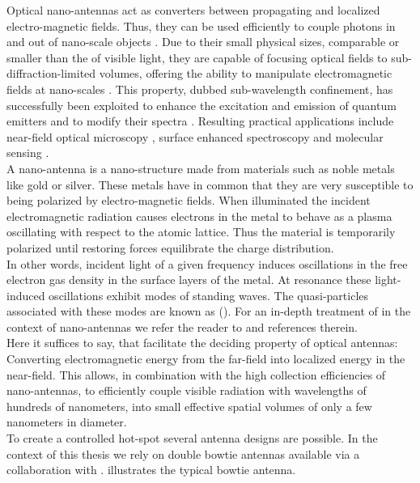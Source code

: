 		Optical nano-antennas act as converters between propagating and localized electro-magnetic fields. Thus, they can be used efficiently to couple photons in and out of nano-scale objects \cite{Curto2010}. Due to their small physical sizes, comparable or smaller than the \wl of visible light, they are capable of focusing optical fields to sub-diffraction-limited volumes, offering the ability to manipulate electromagnetic fields at nano-scales \cite{taminiau2008optical, ding2009understanding}. This property, dubbed sub-wavelength confinement, has successfully been exploited to enhance the excitation and emission of quantum emitters \cite{taminiau2008enhanced, taminiau2008single, kuhn2006enhancement, muskens2007strong} and to modify their spectra \cite{ringler2008shaping}. Resulting practical applications include near-field optical microscopy \cite{keilmann2004near}, surface enhanced spectroscopy \cite{kneipp1997single, martin2014high} and molecular sensing \cite{larsson2007sensing}.
		\\
		A nano-antenna is a nano-structure made from materials such as noble metals like gold or silver. These metals have in common that they are very susceptible to being polarized by electro-magnetic fields. When illuminated the incident electromagnetic radiation causes electrons in the metal to behave as a plasma oscillating with respect to the atomic lattice. Thus the material is temporarily polarized until restoring forces equilibrate the charge distribution.
		\\
		In other words, incident light of a given frequency induces oscillations in the free electron gas density in the surface layers of the metal. At resonance these light-induced oscillations exhibit modes of standing waves. The quasi-particles associated with these modes are known as \lsps (\LSPs).
		For an in-depth treatment of \LSPs in the context of nano-antennas we refer the reader to \cite{rahbany2016towards} and references therein.
		\\
		Here it suffices to say, that \LSPs facilitate the deciding property of optical antennas: Converting electromagnetic energy from the far-field into localized energy in the near-field. This allows, in combination with the high collection efficiencies of nano-antennas, to efficiently couple visible radiation with wavelengths of hundreds of nanometers, into small effective spatial volumes of only a few nanometers in diameter.
		\\
		To create a controlled hot-spot several antenna designs are possible. In the context of this thesis we rely on double bowtie antennas available via a collaboration with \nancy.  illustrates the typical bowtie antenna.

